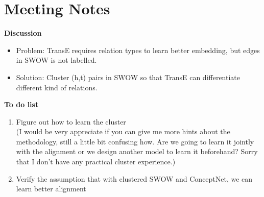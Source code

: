 \section{Meeting Notes}
\textbf{Discussion}
\begin{itemize}
    \item  Problem: TransE requires relation types to learn better embedding, but edges in SWOW is not labelled.
    \item  Solution: Cluster (h,t) pairs in SWOW so that TransE can differentiate different kind of relations.
\end{itemize}


\noindent \textbf{To do list}
\begin{enumerate}
    \item Figure out how to learn the cluster \\(I would be very appreciate if you can give me more hints about the methodology, still a little bit confusing how. Are we going to learn it jointly with the alignment or we design another model to learn it beforehand? Sorry that I don't have any practical cluster experience.)
    \item Verify the assumption that with clustered SWOW and ConceptNet, we can learn better alignment 
\end{enumerate}

\begin{comment}
How do we use ConceptNet sensibly?  
use ConceptNet to distinguish the relations in SWOW, although we don't have it 
The relation types in ConceptNet can help us classify the SWOW relation types

30:40 Trevor 
Gating

34:40: cluster of relations type for SWOW 
every 
K random relations, each is a combinations of 

41:00
Talk about the alignment problem: SWOW has only 20\% of nodes in ConceptNet-100K but 80\% in Conceptnet5.7 

There could be 
\end{comment}


\begin{comment}
Miscellaneous: 
How to deal with the relation types in SWOW?
    \begin{itemize}
        \item use pre-trained language model (eg:Comet) to generate the relation types?
        \item  
    \end{itemize}
How to determine whether two triples are aligned or not? (where is the upper bound?)
How to select the training triples? (training graph)
\end{comment}


